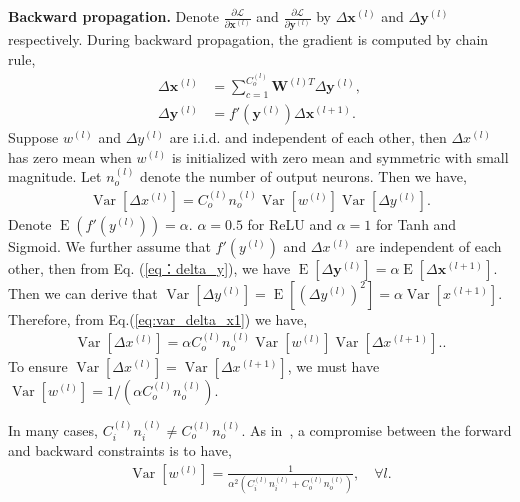 \documentclass[10pt,twocolumn,letterpaper]{article}
\newcommand{\smalltitle}[1]{\vspace{0.2em}\noindent \textbf{{#1}}}
\newcommand{\W}{\mathbf{W}}
\newcommand{\bx}{\mathbf{x}}
\newcommand{\by}{\mathbf{y}}
\newcommand{\Var}{\operatorname{Var}}
\newcommand{\E}{\operatorname{E}}
\newcommand{\Loss}{\mathcal{L}}
\begin{document}
\smalltitle{Backward propagation. }
Denote $\frac{\partial \Loss}{\partial \bx^{(l)}}$ and $ \frac{\partial \Loss}{\partial \by^{(l)}}$ by $\Delta \bx^{(l)}$ and $\Delta \by^{(l)}$ respectively. During backward propagation, the gradient is computed by chain rule,
{\small
\begin{align}
\Delta \bx^{(l)} &= \sum_{c=1}^{C^{(l)}_o}\W^{(l)T} \Delta \by^{(l)}, \\
\Delta \by^{(l)} &= f'(\by^{(l)})\Delta \bx^{(l+1)}. \label{eq：delta_y}
\end{align}
}
\!\!Suppose $w^{(l)}$ and $\Delta y^{(l)}$ are i.i.d. and independent of each other, then $\Delta x^{(l)}$ has zero mean when $w^{(l)}$ is initialized with zero mean and symmetric with small magnitude. 
Let $n_o^{(l)}$ denote the number of output neurons. Then we have,
{\small
\begin{align}
\Var\left[\Delta x^{(l)}\right] = C_o^{(l)}n_o^{(l)}\Var[w^{(l)}]\Var[\Delta y^{(l)}]. \label{eq:var_delta_x1}
\end{align}
}
\!\!Denote $\E(f'(y^{(l)})) = \alpha$.  $\alpha=0.5$ for ReLU and $\alpha=1$ for Tanh and Sigmoid. 
We further assume that $f'(y^{(l)})$ and $\Delta x^{(l)}$ are independent of each other, then from Eq. (\ref{eq：delta_y}), we have $\E\left[\Delta \by^{(l)}\right] =\alpha \E\left[\Delta \bx^{(l+1)}\right].$
Then we can derive that $\Var[\Delta y^{(l)}] = \E[(\Delta y^{(l)})^2] = \alpha\Var[x^{(l+1)}]$.  
Therefore, from Eq.(\ref{eq:var_delta_x1}) we have,
{\small
\begin{align}
\Var\left[\Delta x^{(l)}\right] = \alpha C^{(l)}_on^{(l)}_o\Var[w^{(l)}]\Var[\Delta x^{(l+1)}]. \label{eq:var_delta_x2}.
\end{align} 
}
\!\!To ensure $\Var[\Delta x^{(l)}] = \Var[\Delta x^{(l+1)}]$, we must have $\Var[w^{(l)}] = 1/(\alpha C^{(l)}_on^{(l)}_o)$.

In many cases, $C^{(l)}_in^{(l)}_i \neq C^{(l)}_o n^{(l)}_o$. As in~\cite{glorot2010understanding}, a compromise between the forward and backward constraints is to have,
{\small
\begin{align}
\Var[w^{(l)}] = \frac{1}{\alpha^2 (C^{(l)}_i n^{(l)}_i + C^{(l)}_on^{(l)}_o)}, \quad \forall l.
\label{eq:iniSol}
\end{align}
}
\end{document}
